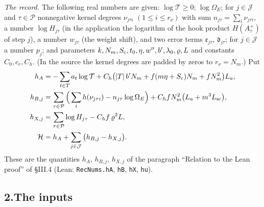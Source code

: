 \documentclass[11pt,letterpaper]{article}
\begin{document}
\emph{The record.} The following real numbers are given: $\log\mathcal T\ge0$; $\log\Omega_E$; for
$j\in\mathcal J$ and $\tau\in\mathcal P$ nonnegative kernel degrees $\nu_{j\tau i}$ $(1\le i\le r_\nu)$
with sum $n_{j\tau}=\sum_i\nu_{j\tau i}$, a number $\log H_{j\tau}$ (in the application the logarithm of
the hook product $H(A^+_\tau)$ of step $j$), a number $w_{j\tau}$ (the weight shift), and two error terms
$\mathfrak e_{j\tau}$, $\mathfrak d_{j\tau}$; for $j\in\mathcal J$ a number $p_j$; and parameters
$k,N_m,S_{\rm c},t_0,\eta,w'',b',\lambda_0,\varrho,L$ and constants $C_0,c_e,C_h$. (In the source the
kernel degrees are padded by zeros to $r_\nu=N_m$.) Put
\begin{align}\label{D:252}
 h_A&=-\sum_{t\in T}a_t\log\mathcal T+C_h\big(|T|\,b'N_m+f(m\eta+S_{\rm c})N_m+fN_m^2\big)L_a,\\
 h_{B,j}&=\sum_{\tau\in\mathcal P}\Big(\sum_ih(\nu_{j\tau i})-n_{j\tau}\log\Omega_E\Big)
           +C_hfN_m^2\big(L_a+m^3L_{\rm sc}\big),\\
 h_{X,j}&=\sum_{\tau\in\mathcal P}\log H_{j\tau}-C_hf\,\varrho^2L,\\
 \mathcal H&=h_A+\sum_{j\in\mathcal J}\big(h_{B,j}-h_{X,j}\big).
\end{align}
These are the quantities $h_A$, $h_{B,j}$, $h_{X,j}$ of the paragraph ``Relation to the Lean proof'' of
\S III.4 (Lean: \texttt{RecNums.hA}, \texttt{hB}, \texttt{hX}, \texttt{hu}).

\subsection*{2.\quad The inputs}
\end{document}
